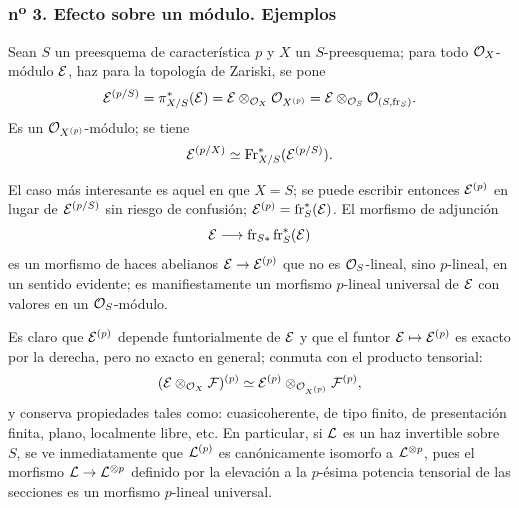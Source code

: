 \subsubsection*{n\textsuperscript{o} 3. Efecto sobre un módulo. Ejemplos}

Sean $S$ un preesquema de característica $p$ y $X$ un $S$-preesquema; para todo $\mathcal{O}_X$-módulo $\mathcal E$, haz para la topología de Zariski, se pone
\[
\mathcal E^{(p/S)}=\pi_{X/S}^*(\mathcal E)=\mathcal E\otimes_{\mathcal{O}_X}\mathcal{O}_{X^{(p)}}
 =\mathcal E\otimes_{\mathcal{O}_S}\mathcal{O}_{(S,\operatorname{fr}_S)}.
\]
Es un $\mathcal{O}_{X^{(p)}}$-módulo; se tiene
\[
\mathcal E^{(p/X)}\simeq \operatorname{Fr}_{X/S}^*(\mathcal E^{(p/S)}).
\]

El caso más interesante es aquel en que $X=S$; se puede escribir entonces $\mathcal E^{(p)}$ en lugar de $\mathcal E^{(p/S)}$ sin riesgo de confusión; $\mathcal E^{(p)}=\operatorname{fr}_S^*(\mathcal E)$. El morfismo de adjunción
\[
\mathcal E\longrightarrow \operatorname{fr}_{S*}\operatorname{fr}_S^*(\mathcal E)
\]
es un morfismo de haces abelianos $\mathcal E\to\mathcal E^{(p)}$ que no es $\mathcal{O}_S$-lineal, sino $p$-lineal, en un sentido evidente; es manifiestamente un morfismo $p$-lineal universal de $\mathcal E$ con valores en un $\mathcal{O}_S$-módulo.

Es claro que $\mathcal E^{(p)}$ depende funtorialmente de $\mathcal E$ y que el funtor $\mathcal E\mapsto\mathcal E^{(p)}$ es exacto por la derecha, pero no exacto en general; conmuta con el producto tensorial:
\[
(\mathcal E\otimes_{\mathcal{O}_X}\mathcal F)^{(p)}\simeq
\mathcal E^{(p)}\otimes_{\mathcal{O}_{X^{(p)}}}\mathcal F^{(p)},
\]
y conserva propiedades tales como: cuasicoherente, de tipo finito, de presentación finita, plano, localmente libre, etc. En particular, si $\mathcal L$ es un haz invertible sobre $S$, se ve inmediatamente que $\mathcal L^{(p)}$ es canónicamente isomorfo a $\mathcal L^{\otimes p}$, pues el morfismo $\mathcal L\to\mathcal L^{\otimes p}$ definido por la elevación a la $p$-ésima potencia tensorial de las secciones es un morfismo $p$-lineal universal.
